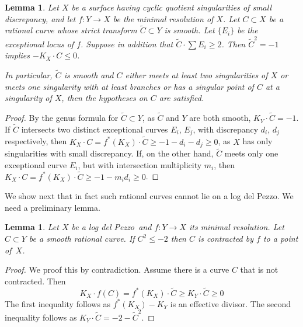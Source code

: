 \documentclass[12pt,a4paper]{book}      %
\newtheorem{lem}[thm]{Lemma}
\theoremstyle{definition}
\newcommand{\ldp}{log del Pezzo}
\newcommand{\minres}{minimal resolution}
\newcommand{\wt}[1]{\widetilde #1}
\begin{document}
\begin{lem}\label{lem!badcurve}
Let $X$ be a surface having cyclic quotient singularities of small discrepancy, and let  $f \colon Y \rightarrow X$ be the minimal resolution of $X$. Let $C \subset X$ be a rational curve whose 
strict transform $\widetilde C \subset Y$ is smooth. Let $\{ E_i \}$ be the exceptional locus of $f$. Suppose in addition that 
$\widetilde C \cdot \sum E_i \geq 2$.
Then $\widetilde C^2 = -1$ implies $-K_X \cdot C \leq 0$.

In particular, $\widetilde C$ is smooth and
$C$ either meets at least two singularities of $X$ or meets one singularity
with at least branches or has a singular point of $C$ at a singularity of $X$,
then the hypotheses on $C$ are satisfied.
\end{lem}
\begin{proof}
By the genus formula for $\widetilde C\subset Y$, as $\widetilde C$ and $Y$ are both smooth,
$K_Y \cdot \widetilde C = -1$. If $\wt C$ intersects two distinct exceptional curves $E_i$, $E_j$,
with discrepancy $d_i$, $d_j$ respectively, then
 $K_X \cdot C = f^*(K_X) \cdot \widetilde C \geq -1 - d_i - d_j  \geq 0$,
 as $X$ has only singularities with small discrepancy. 
 If, on the other hand, $\wt C$ meets only one exceptional curve $E_i$, but with intersection
multiplicity $m_i$, then $K_X \cdot C = f^*(K_X) \cdot \widetilde C \geq -1 - m_id_i  \geq 0$.
\end{proof}

We show next that in fact such rational curves cannot lie on a \ldp.
We need a preliminary lemma.
\begin{lem}\label{lem!minus2curve}
Let $X$ be a \ldp\ and $f \colon Y \rightarrow X$ its \minres.
Let $C\subset Y$ be a smooth rational curve. If $C^2\le-2$ then $C$ is contracted by $f$
to a point of~$X$.
\end{lem}

\begin{proof}
We proof this by contradiction. Assume there is a curve $C$ that is not contracted. Then 
\[
K_X \cdot f(C) = f^*(K_X) \cdot \wt{C} \geq K_Y \cdot \wt{C} \geq 0
\]
The first inequality follows as $f^*(K_X) - K_Y$ is an effective divisor. The second inequality follows as $K_Y \cdot \wt{C} = -2 - \wt{C}^2$.
\end{proof}
\end{document}
